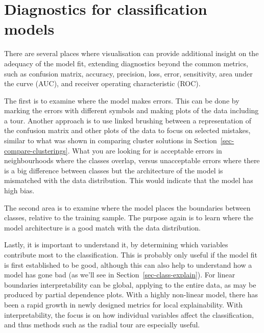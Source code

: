 \documentclass[
  letterpaper,
]{krantz}
\begin{document}
 

\chapter{Diagnostics for classification models}\label{sec-class-diag}

There are several places where visualisation can provide additional
insight on the adequacy of the model fit, extending diagnostics beyond
the common metrics, such as confusion matrix, accuracy, precision, loss,
error, sensitivity, area under the curve (AUC), and receiver operating
characteristic (ROC).

 
 
 

The first is to examine where the model makes errors. This can be done
by marking the errors with different symbols and making plots of the
data including a tour. Another approach is to use linked brushing
between a representation of the confusion matrix and other plots of the
data to focus on selected mistakes, similar to what was shown in
comparing cluster solutions in Section~\ref{sec-compare-clusterings}.
What you are looking for is acceptable errors in neighbourhoods where
the classes overlap, versus unacceptable errors where there is a big
difference between classes but the architecture of the model is
mismatched with the data distribution. This would indicate that the
model has high bias. 

The second area is to examine where the model places the boundaries
between classes, relative to the training sample. The purpose again is
to learn where the model architecture is a good match with the data
distribution.

Lastly, it is important to understand it, by determining which variables
contribute most to the classification. This is probably only useful if
the model fit is first established to be good, although this can also
help to understand how a model has gone bad (as we'll see in
Section~\ref{sec-class-explain}). For linear boundaries interpretability
can be global, applying to the entire data, as may be produced by
partial dependence plots. With a highly non-linear model, there has been
a rapid growth in newly designed metrics for local explainability. With
interpretability, the focus is on how individual variables affect the
classification, and thus methods such as the radial tour are especially
useful.  
\end{document}
